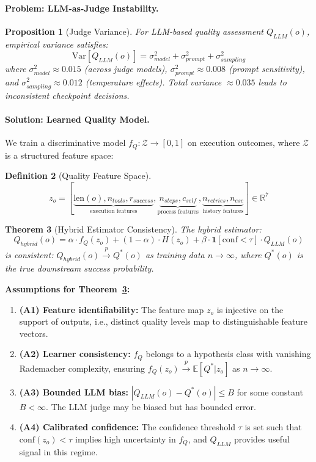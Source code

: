 \documentclass{article}
\theoremstyle{plain}
\newtheorem{theorem}{Theorem}[section]
\newtheorem{proposition}[theorem]{Proposition}
\theoremstyle{definition}
\newtheorem{definition}[theorem]{Definition}
\theoremstyle{remark}
\begin{document}
\paragraph{Problem: LLM-as-Judge Instability.}

\begin{proposition}[Judge Variance]
	\label{prop:variance}
	For LLM-based quality assessment $Q_{LLM}(o)$, empirical
	variance satisfies:
	\[
	\text{Var}[Q_{LLM}(o)] = \sigma^2_{model} + \sigma^2_{prompt}
	+ \sigma^2_{sampling}
	\]
	where $\sigma^2_{model} \approx 0.015$ (across judge models),
	$\sigma^2_{prompt} \approx 0.008$ (prompt sensitivity), and
	$\sigma^2_{sampling} \approx 0.012$ (temperature effects).
	Total variance $\approx 0.035$ leads to inconsistent checkpoint
	decisions.
\end{proposition}

\paragraph{Solution: Learned Quality Model.}

We train a discriminative model $f_Q: \mathcal{Z} \to [0,1]$
on execution outcomes, where $\mathcal{Z}$ is a structured
feature space:

\begin{definition}[Quality Feature Space]
	\[
	z_o = [\underbrace{\text{len}(o), n_{tools}, r_{success}}_{\text{execution features}},
	\underbrace{n_{steps}, c_{self}}_{\text{process features}},
	\underbrace{n_{retries}, n_{esc}}_{\text{history features}}] \in \mathbb{R}^7
	\]
\end{definition}

\begin{theorem}[Hybrid Estimator Consistency]
	\label{thm:consistency}
	The hybrid estimator:
	\[
	Q_{hybrid}(o) = \alpha \cdot f_Q(z_o) + (1-\alpha) \cdot H(z_o)
	+ \beta \cdot \mathbf{1}[\text{conf} < \tau] \cdot Q_{LLM}(o)
	\]
	is consistent: $Q_{hybrid}(o) \xrightarrow{p} Q^*(o)$ as
	training data $n \to \infty$, where $Q^*(o)$ is the true
	downstream success probability.
\end{theorem}

\textbf{Assumptions for Theorem~\ref{thm:consistency}:}
\begin{enumerate}[nosep,leftmargin=*]
	\item \textbf{(A1) Feature identifiability:} The feature map $z_o$ is injective on the support of outputs, i.e., distinct quality levels map to distinguishable feature vectors.
	\item \textbf{(A2) Learner consistency:} $f_Q$ belongs to a hypothesis class with vanishing Rademacher complexity, ensuring $f_Q(z_o) \xrightarrow{p} \mathbb{E}[Q^* | z_o]$ as $n \to \infty$.
	\item \textbf{(A3) Bounded LLM bias:} $|Q_{LLM}(o) - Q^*(o)| \leq B$ for some constant $B < \infty$. The LLM judge may be biased but has bounded error.
	\item \textbf{(A4) Calibrated confidence:} The confidence threshold $\tau$ is set such that $\text{conf}(z_o) < \tau$ implies high uncertainty in $f_Q$, and $Q_{LLM}$ provides useful signal in this regime.
\end{enumerate}
\end{document}
